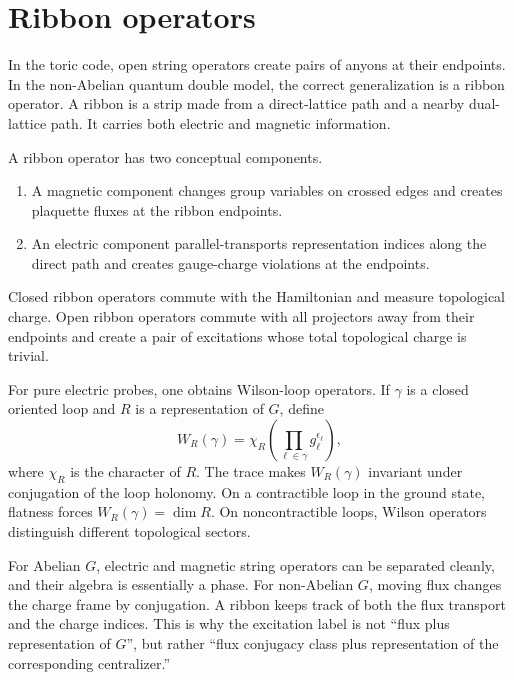 \section{Ribbon operators}
\label{sec:quantum-double-ribbon-operators}

In the toric code, open string operators create pairs of anyons at their
endpoints.  In the non-Abelian quantum double model, the correct generalization
is a ribbon operator.  A ribbon is a strip made from a direct-lattice path and a
nearby dual-lattice path.  It carries both electric and magnetic information.

A ribbon operator has two conceptual components.
\begin{enumerate}[label=(\roman*)]
    \item A magnetic component changes group variables on crossed edges and
    creates plaquette fluxes at the ribbon endpoints.
    \item An electric component parallel-transports representation indices along
    the direct path and creates gauge-charge violations at the endpoints.
\end{enumerate}
Closed ribbon operators commute with the Hamiltonian and measure topological
charge.  Open ribbon operators commute with all projectors away from their
endpoints and create a pair of excitations whose total topological charge is
trivial.

For pure electric probes, one obtains Wilson-loop operators.  If \(\gamma\) is a
closed oriented loop and \(R\) is a representation of \(G\), define
\begin{equation}
\label{eq:quantum-double-wilson-loop}
    W_R(\gamma)
    =
    \chi_R\!\left(\prod_{\ell\in\gamma}g_{\ell}^{\epsilon_{\ell}}\right),
\end{equation}
where \(\chi_R\) is the character of \(R\).  The trace makes
\(W_R(\gamma)\) invariant under conjugation of the loop holonomy.  On a
contractible loop in the ground state, flatness forces \(W_R(\gamma)=\dim R\).
On noncontractible loops, Wilson operators distinguish different topological
sectors.

\begin{remark}
For Abelian \(G\), electric and magnetic string operators can be separated
cleanly, and their algebra is essentially a phase.  For non-Abelian \(G\), moving
flux changes the charge frame by conjugation.  A ribbon keeps track of both the
flux transport and the charge indices.  This is why the excitation label is not
``flux plus representation of \(G\)'', but rather ``flux conjugacy class plus
representation of the corresponding centralizer.''
\end{remark}

